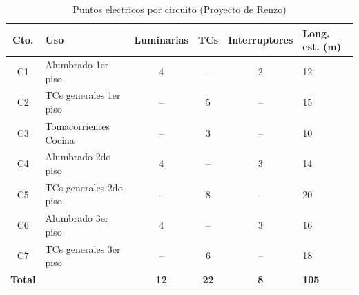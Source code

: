 \begin{table}[H]
\centering
\small
\caption{Puntos electricos por circuito (Proyecto de Renzo)}
\label{tab:puntos-por-circuito}
\begin{tabularx}{\textwidth}{c L{4.5cm} c c c Y}
\toprule
\textbf{Cto.} & \textbf{Uso} & \textbf{Luminarias} & \textbf{TCs} & \textbf{Interruptores} & \textbf{Long. est. (m)} \\
\midrule
C1 & Alumbrado 1er piso & 4 & -- & 2 & 12 \\
C2 & TCs generales 1er piso & -- & 5 & -- & 15 \\
C3 & Tomacorrientes Cocina & -- & 3 & -- & 10 \\
C4 & Alumbrado 2do piso & 4 & -- & 3 & 14 \\
C5 & TCs generales 2do piso & -- & 8 & -- & 20 \\
C6 & Alumbrado 3er piso & 4 & -- & 3 & 16 \\
C7 & TCs generales 3er piso & -- & 6 & -- & 18 \\
\midrule
\textbf{Total} & & \textbf{12} & \textbf{22} & \textbf{8} & \textbf{105} \\
\bottomrule
\end{tabularx}
\end{table}